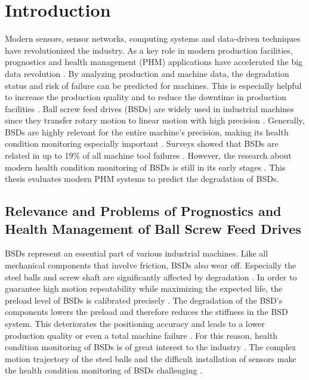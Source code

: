 
\chapter{Introduction}
Modern sensors, sensor networks, computing systems and data-driven techniques have revolutionized the industry. As a key role in modern production facilities, prognostics and health management (PHM) applications have accelerated the big data revolution \cite{ZHAO2019213}. By analyzing production and machine data, the degradation status and risk of failure can be predicted for machines. This is especially helpful to increase the production quality and to reduce the downtime in production facilities \cite{Denkena2021}. Ball screw feed drives (BSDs) are widely used in industrial machines since they transfer rotary motion to linear motion with high precision \cite{LiPin2018}. Generally, BSDs are highly relevant for the entire machine’s precision, making its health condition monitoring especially important \cite{LiPin2018}. Surveys showed that BSDs are related in up to 19\% of all machine tool failures \cite{Denkena2021}. However, the research about modern health condition monitoring of BSDs is still in its early stages \cite{LiPin2018}. This thesis evaluates modern PHM systems to predict the degradation of BSDs.


\section{Relevance and Problems of Prognostics and Health Management of Ball Screw Feed Drives}
BSDs represent an essential part of various industrial machines. Like all mechanical components that involve friction, BSDs also wear off. Especially the steel balls and screw shaft are significantly affected by degradation \cite{Pandhare2021}. In order to guarantee high motion repeatability while maximizing the expected life, the preload level of BSDs is calibrated precisely \cite{Pandhare2021}. The degradation of the BSD's components lowers the preload and therefore reduces the stiffness in the BSD system. This deteriorates the positioning accuracy and leads to a lower production quality or even a total machine failure \cite{Pandhare2021}. For this reason, health condition monitoring of BSDs is of great interest to the industry \cite{Pandhare2021}. The complex motion trajectory of the steel balls and the difficult installation of sensors make the health condition monitoring of BSDs challenging \cite{LiPin2018}.   

